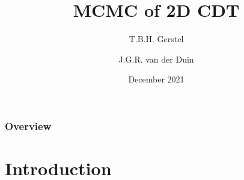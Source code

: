 \documentclass{beamer}
\title{MCMC of 2D CDT}
\author{T.B.H. Gerstel \and J.G.R. van der Duin}
\date{December 2021}
\institute{Radboud University Nijmegen}
\begin{document}
\frame{\titlepage}

\begin{frame}
    \frametitle{Overview}
    \tableofcontents
\end{frame}

\section{Introduction}
\end{document}
